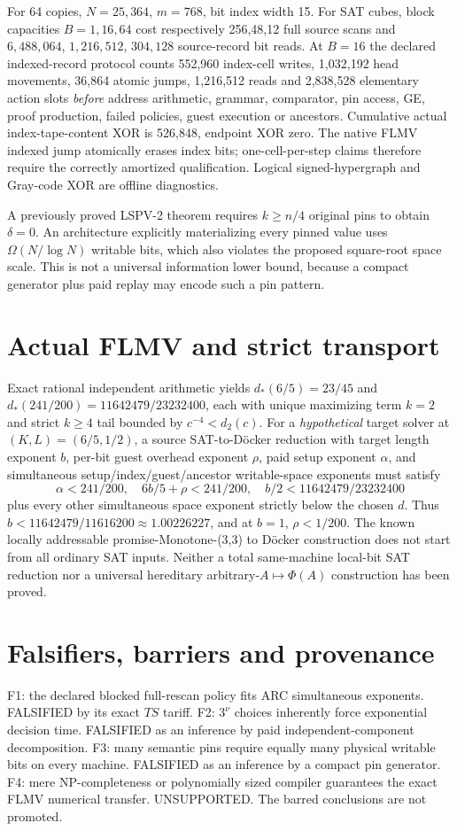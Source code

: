 \documentclass[11pt]{article}
\begin{document}
For 64 copies, $N=25{,}364$, $m=768$, bit index width 15. For SAT cubes, block capacities $B=1,16,64$ cost respectively 256,48,12 full source scans and $6{,}488{,}064$, $1{,}216{,}512$, $304{,}128$ source-record bit reads. At $B=16$ the declared indexed-record protocol counts 552,960 index-cell writes, 1,032,192 head movements, 36,864 atomic jumps, 1,216,512 reads and 2,838,528 elementary action slots \emph{before} address arithmetic, grammar, comparator, pin access, GE, proof production, failed policies, guest execution or ancestors. Cumulative actual index-tape-content XOR is 526,848, endpoint XOR zero. The native FLMV indexed jump atomically erases index bits; one-cell-per-step claims therefore require the correctly amortized qualification. Logical signed-hypergraph and Gray-code XOR are offline diagnostics.

A previously proved LSPV-2 theorem requires $k\ge n/4$ original pins to obtain $\delta=0$. An architecture explicitly materializing every pinned value uses $\Omega(N/\log N)$ writable bits, which also violates the proposed square-root space scale. This is not a universal information lower bound, because a compact generator plus paid replay may encode such a pin pattern.

\section{Actual FLMV and strict transport}
Exact rational independent arithmetic yields $d_*(6/5)=23/45$ and $d_*(241/200)=11642479/23232400$, each with unique maximizing term $k=2$ and strict $k\ge4$ tail bounded by $c^{-4}<d_2(c)$. For a \emph{hypothetical} target solver at $(K,L)=(6/5,1/2)$, a source SAT-to-D\"ocker reduction with target length exponent $b$, per-bit guest overhead exponent $\rho$, paid setup exponent $\alpha$, and simultaneous setup/index/guest/ancestor writable-space exponents must satisfy
\[
\alpha<241/200,\quad 6b/5+\rho<241/200,\quad b/2<11642479/23232400
\]
plus every other simultaneous space exponent strictly below the chosen $d$. Thus $b<11642479/11616200\approx1.00226227$, and at $b=1$, $\rho<1/200$. The known locally addressable promise-Monotone-(3,3) to D\"ocker construction does not start from all ordinary SAT inputs. Neither a total same-machine local-bit SAT reduction nor a universal hereditary arbitrary-$A\mapsto\Phi(A)$ construction has been proved.

\section{Falsifiers, barriers and provenance}
F1: the declared blocked full-rescan policy fits ARC simultaneous exponents. FALSIFIED by its exact $TS$ tariff. F2: $3^\nu$ choices inherently force exponential decision time. FALSIFIED as an inference by paid independent-component decomposition. F3: many semantic pins require equally many physical writable bits on every machine. FALSIFIED as an inference by a compact pin generator. F4: mere NP-completeness or polynomially sized compiler guarantees the exact FLMV numerical transfer. UNSUPPORTED. The barred conclusions are not promoted.
\end{document}
